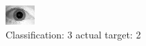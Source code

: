 \begin{figure}[h!]
\begin{center}
\includegraphics[width=0.60\columnwidth]{figures/ID1709_class_3_target_2.png}
\end{center}
\caption{ Classification: 3 actual target: 2}
\label{fig:ID1709_class_3_target_2}
\end{figure}
